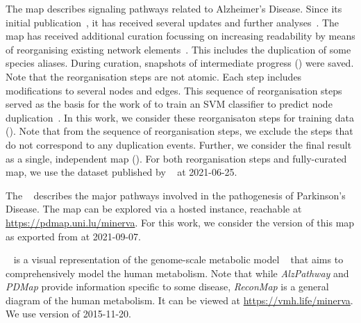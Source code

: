 \documentclass[
	fontsize=10pt, %
	twoside=true, %
	secnumdepth=1, %
  toc=indentunnumbered %
]{kaobook}
\begin{document}
The  map describes signaling pathways related to Alzheimer's
Disease. Since its initial publication~\cite{mizuno_AlzPathwayComprehensiveMap_2012}, it has received several updates
and further analyses~\cite{ogishima_MapAlzheimerDiseasesignaling_2013,
  ogishima_AlzPathwayUpdatedMap_2016, mizuno_NetworkAnalysisComprehensive_2016}.
%
The map has received additional curation focussing on increasing readability by
means of reorganising existing network
elements~\cite{ostaszewski_AlzPathwayRegorganisationSteps_2021}. This includes
the duplication of some species aliases. During curation, snapshots of
intermediate progress () were saved. Note that the
reorganisation steps are not atomic. Each step includes modifications to several
nodes and edges. This sequence of reorganisation steps served as the basis for
the work of \citeauthor{nielsen_MachineLearningSupport_2019} to train an SVM
classifier to predict node duplication~\cite{nielsen_MachineLearningSupport_2019}. In this work, we consider these
reorganisaton steps for training data (\ADMap{}). Note that from the sequence of
reorganisation steps, we exclude the steps that do not correspond to any
duplication events. Further, we consider the final result as a single,
independent map (\ADLast{}). For both reorganisation steps and fully-curated
map, we use the dataset published by
\citeauthor{ostaszewski_AlzPathwayRegorganisationSteps_2021}~\cite{ostaszewski_AlzPathwayRegorganisationSteps_2021} at 2021-06-25.

The ~\cite{fujita_IntegratingPathwaysParkinson_2014} describes the
major pathways involved in the pathogenesis of Parkinson's Disease. The map can
be explored via a hosted  instance, reachable at
\url{https://pdmap.uni.lu/minerva}. For this work, we consider the version of
this map as exported from  at 2021-09-07.

~\cite{noronha_ReconMapInteractiveVisualization_2017} is a visual
representation of the genome-scale metabolic model ~\cite{thiele_CommunitydrivenGlobalReconstruction_2013} that aims to
comprehensively model the human metabolism. Note that while \textit{AlzPathway}
and \textit{PDMap} provide information specific to some disease,
\textit{ReconMap} is a general diagram of the human metabolism. It can be viewed
at \url{https://vmh.life/minerva}. We use version  of 2015-11-20.
\end{document}
